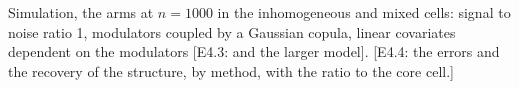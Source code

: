 \begin{table}[t]
\color{colR1}
\caption{Simulation, the arms at $n = 1000$ in the inhomogeneous and mixed cells: signal to noise ratio 1, modulators coupled by a Gaussian copula, linear covariates dependent on the modulators [E4.3: and the larger model]. [E4.4: the errors and the recovery of the structure, by method, with the ratio to the core cell.]}
\label{tab:sim-arms}
\centering
{}
\end{table}
